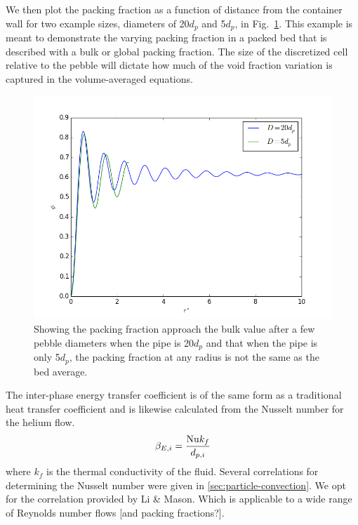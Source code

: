 We then plot the packing fraction as a function of distance from the container wall for two example sizes, diameters of 20$d_p$ and 5$d_p$, in Fig.~\ref{fig:packingDist}. This example is meant to demonstrate the varying packing fraction in a packed bed that is described with a bulk or global packing fraction. The size of the discretized cell relative to the pebble will dictate how much of the void fraction variation is captured in the volume-averaged equations.

\begin{figure}[htbp]
\begin{center}
	\includegraphics[width = \singleimagewidth]{chapters/figures/annular-packing-fraction.png}
	\caption{Showing the packing fraction approach the bulk value after a few pebble diameters when the pipe is 20$d_p$ and that when the pipe is only 5$d_p$, the packing fraction at any radius is not the same as the bed average.}
	\label{fig:packingDist}
\end{center}
\end{figure}
\FloatBarrier


The inter-phase energy transfer coefficient is of the same form as a traditional heat transfer coefficient and is likewise calculated from the Nusselt number for the helium flow.
\begin{equation}\label{eq:interphase-energy}
	\beta_{E,i} = \frac{\mathrm{Nu} k_f}{d_{p,i}}
\end{equation}
where $k_f$ is the thermal conductivity of the fluid. Several correlations for determining the Nusselt number were given in \cref{sec:particle-convection}. We opt for the correlation provided by Li \& Mason.\cite{Li2000} Which is applicable to a wide range of Reynolds number flows [and packing fractions?].

